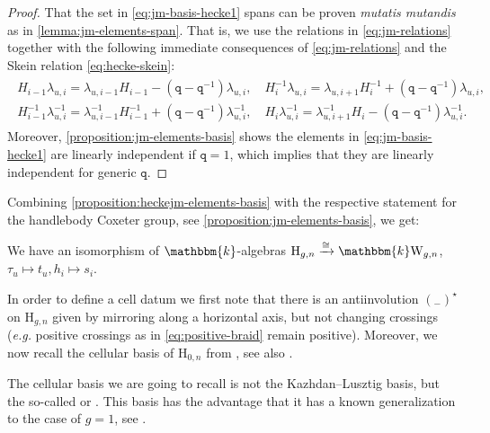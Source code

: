 \documentclass[a4paper,11pt]{amsart}
\let\emph\relax
\newcommand{\eg}{\textsl{e.g.}}
\newcommand{\muta}{\textsl{mutatis mutandis}}
\newcommand{\placeholder}{{}_{-}}
\newcommand{\setstuff}[1]{\mathrm{#1}}
\newcommand{\KK}{\mathbbm{k}}
\newcommand{\varsym}[1]{\mathtt{#1}}
\newcommand{\qvar}{\varsym{q}}
\numberwithin{equation}{section}
\let\fullref\autoref
\begin{document}
\begin{proof}
That the set in \eqref{eq:jm-basis-hecke1} spans can be proven {\muta} as 
in \fullref{lemma:jm-elements-span}. 
That is, we use the relations in \eqref{eq:jm-relations} 
together with the following immediate consequences 
of \eqref{eq:jm-relations} and the Skein relation \eqref{eq:hecke-skein}:
\begin{gather*}
\begin{gathered}
H_{i-1}\lambda_{u,i}
=
\lambda_{u,i-1}H_{i-1}
-(\qvar-\qvar^{-1})\lambda_{u,i}
,\quad
H_{i}^{-1}\lambda_{u,i}
=
\lambda_{u,i+1}H_{i}^{-1}
+(\qvar-\qvar^{-1})\lambda_{u,i}
,\\
H_{i-1}^{-1}\lambda_{u,i}^{-1}
=
\lambda_{u,i-1}^{-1}H_{i-1}^{-1}
+(\qvar-\qvar^{-1})\lambda_{u,i}^{-1}
,\quad
H_{i}\lambda_{u,i}^{-1}
=
\lambda_{u,i+1}^{-1}H_{i}
-(\qvar-\qvar^{-1})\lambda_{u,i}^{-1}.
\end{gathered}
\end{gather*}
Moreover, 
\fullref{proposition:jm-elements-basis} shows the elements in \eqref{eq:jm-basis-hecke1} are 
linearly independent if $\qvar=1$, which implies that they are linearly independent for generic $\qvar$.
\end{proof}

Combining \fullref{proposition:heckejm-elements-basis} 
with the respective 
statement for the handlebody Coxeter group, see \fullref{proposition:jm-elements-basis}, we get:

\begin{corollary}
We have an isomorphism of $\KK$-algebras $\setstuff{H}_{g,n}\xrightarrow{\cong}\KK\setstuff{W}_{g,n}$, 
$\tau_{u}\mapsto t_{u},h_{i}\mapsto s_{i}$.
\end{corollary}

In order to define a cell datum we first note that
there is an antiinvolution $(\placeholder)^{\star}$ 
on $\setstuff{H}_{g,n}$ given by mirroring along a horizontal 
axis, but not changing crossings ({\eg} positive crossings
as in \eqref{eq:positive-braid} remain positive).
Moreover, we now recall the 
cellular basis of $\setstuff{H}_{0,n}$ from \cite{Mu-typea-hecke}, see also \cite[Chapter 3]{Ma-hecke-schur}. 

\begin{remark}
The cellular basis we are going to recall is not the Kazhdan--Lusztig 
basis, but the so-called \emph{Murphy} or
\emph{standard basis}. This basis 
has the advantage that it has a known generalization to the case of $g=1$, 
see \cite{DiJaMa-cyclotomic-q-schur}.
\end{remark}
\end{document}
